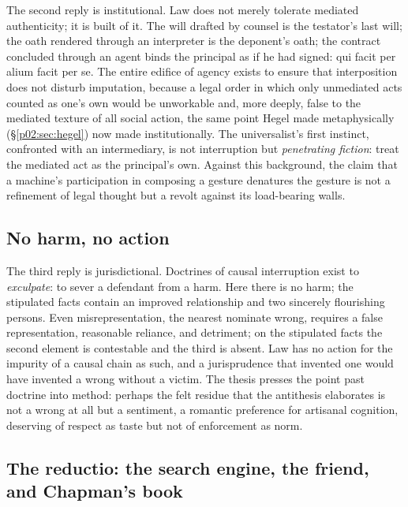\documentclass[11pt,a4paper]{article}
\newcommand{\term}[1]{\textit{\textcolor{pinkitalic}{#1}}}
\begin{document}
The second reply is institutional. Law does not merely tolerate mediated authenticity; it is built of it. The will drafted by counsel is the testator's last will; the oath rendered through an interpreter is the deponent's oath; the contract concluded through an agent binds the principal as if he had signed: qui facit per alium facit per se. The entire edifice of agency exists to ensure that interposition does not disturb imputation, because a legal order in which only unmediated acts counted as one's own would be unworkable and, more deeply, false to the mediated texture of all social action, the same point Hegel made metaphysically (\S\ref{p02:sec:hegel}) now made institutionally. The universalist's first instinct, confronted with an intermediary, is not interruption but \term{penetrating fiction}: treat the mediated act as the principal's own. Against this background, the claim that a machine's participation in composing a gesture denatures the gesture is not a refinement of legal thought but a revolt against its load-bearing walls.

\subsection{No harm, no action}
\label{p02:sec:thesis-noharm}

The third reply is jurisdictional. Doctrines of causal interruption exist to \emph{exculpate}: to sever a defendant from a harm. Here there is no harm; the stipulated facts contain an improved relationship and two sincerely flourishing persons. Even misrepresentation, the nearest nominate wrong, requires a false representation, reasonable reliance, and detriment; on the stipulated facts the second element is contestable and the third is absent. Law has no action for the impurity of a causal chain as such, and a jurisprudence that invented one would have invented a wrong without a victim. The thesis presses the point past doctrine into method: perhaps the felt residue that the antithesis elaborates is not a wrong at all but a sentiment, a romantic preference for artisanal cognition, deserving of respect as taste but not of enforcement as norm.

\subsection{The reductio: the search engine, the friend, and Chapman's book}
\label{p02:sec:thesis-reductio}
\end{document}
